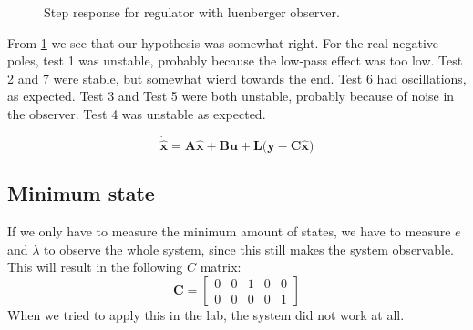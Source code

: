 \begin{figure}[h!]
    \centering
    \caption{Step response for regulator with luenberger observer.}
    \label{fig:luenbergerPlot}
\end{figure}

From \ref{fig:luenbergerPlot} we see that our hypothesis was somewhat right. For the real negative poles, test 1 was unstable, probably because the low-pass effect was too low. Test 2 and 7 were stable, but somewhat wierd towards the end. Test 6 had oscillations, as expected. Test 3 and Test 5 were both unstable, probably because of noise in the observer. Test 4 was unstable as expected.

\begin{equation}
    \mathbf{\dot{\hat{x}}}=\mathbf{A\hat{x}+Bu + L}\mathbf{(y-C\hat{x}})
\end{equation}
\subsection{Minimum state}
If we only have to measure the minimum amount of states, we have to measure $e$ and $\lambda$ to observe the whole system, since this still makes the system observable. This will result in the following $C$ matrix:
\begin{equation}
    \mathbf{C}=
    \begin{bmatrix}
        0&0&1&0&0\\
        0&0&0&0&1
    \end{bmatrix}
\end{equation}
When we tried to apply this in the lab, the system did not work at all.
